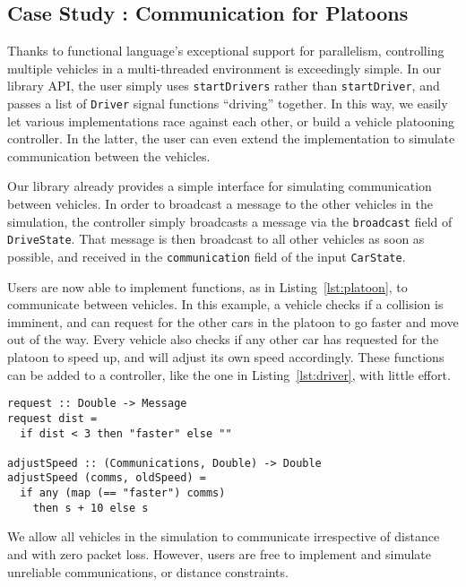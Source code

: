 \subsection{Case Study : Communication for Platoons}

Thanks to functional language's exceptional support for parallelism, controlling multiple vehicles in a multi-threaded environment is exceedingly simple. 
In our library API, the user simply uses \texttt{startDrivers} rather than \texttt{startDriver}, and passes a list of \texttt{Driver} signal functions ``driving'' together.
In this way, we easily let various implementations race against each other, or build a vehicle platooning controller.
In the latter, the user can even extend the implementation to simulate communication between the vehicles.

Our library already provides a simple interface for simulating communication between vehicles.
In order to broadcast a message to the other vehicles in the simulation, the controller simply broadcasts a message via the \texttt{broadcast} field of \texttt{DriveState}.
That message is then broadcast to all other vehicles as soon as possible, and received in the \texttt{communication} field of the input \texttt{CarState}.

Users are now able to implement functions, as in Listing~\ref{lst:platoon}, to communicate between vehicles.
In this example, a vehicle checks if a collision is imminent, and can request for the other cars in the platoon to go faster and move out of the way.
Every vehicle also checks if any other car has requested for the platoon to speed up, and will adjust its own speed accordingly.
These functions can be added to a controller, like the one in Listing~\ref{lst:driver}, with little effort.
\begin{lstlisting}[float,floatplacement=T,caption=Communicating between controllers, label=lst:platoon]
request :: Double -> Message
request dist = 
  if dist < 3 then "faster" else ""

adjustSpeed :: (Communications, Double) -> Double
adjustSpeed (comms, oldSpeed) =
  if any (map (== "faster") comms)
    then s + 10 else s
\end{lstlisting}

We allow all vehicles in the simulation to communicate irrespective of distance and with zero packet loss.
However, users are free to implement and simulate unreliable communications, or distance constraints.  
